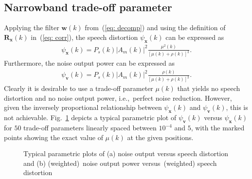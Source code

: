 \documentclass{article}
\begin{document}
\subsection{Narrowband trade-off parameter}
Applying the filter $\mathbf{w}(k)$ from~(\ref{eq: decomp}) and using the definition of $\mathbf{R}_{\mathbf{x}}(k)$ in~(\ref{eq: corr}), the speech distortion $\psi_{\mathbf{x}}(k)$ can be expressed as
\begin{align}
  \label{eq: epsx}
   \psi_{\mathbf{x}}(k) = P_s(k) |A_m(k)|^2 \frac{\mu^2(k)}{[\mu(k)+\rho(k)]^2}.
\end{align}
Furthermore, the noise output power can be expressed as
\begin{align}
  \label{eq: epsv}
  \psi_{\mathbf{v}}(k) = P_s(k) |A_m(k)|^2 \frac{\rho(k)}{[\mu(k)+\rho(k)]^2}.
\end{align}
Clearly it is desirable to use a trade-off parameter $\mu(k)$ that yields no speech distortion and no noise output power, i.e.,~perfect noise reduction.
However, given the inversely proportional relationship between $\psi_{\mathbf{x}}(k)$ and $\psi_{\mathbf{v}}(k)$, this is not achievable.
Fig.~\ref{subfig: lcurvea} depicts a typical parametric plot of $\psi_{\mathbf{v}}(k)$ versus $\psi_{\mathbf{x}}(k)$ for $50$ trade-off parameters linearly spaced between $10^{-4}$ and $5$, with the marked points showing the exact value of $\mu(k)$ at the given positions.
\begin{figure}[b!]%
\centering
\begin{subfigure}{0.5\columnwidth}
  \vspace{-0.2cm}
  \caption{}
  \label{subfig: lcurvea}%
\end{subfigure}\hfill%
\begin{subfigure}{0.5\columnwidth}
  \vspace{-0.2cm}
  \caption{}
  \label{subfig: lcurveb}%
\end{subfigure}
\caption{Typical parametric plots of (a) noise output versus speech distortion and (b) (weighted)~noise output power versus~(weighted) speech distortion}
\label{fig: lc}
\end{figure}%
\end{document}
